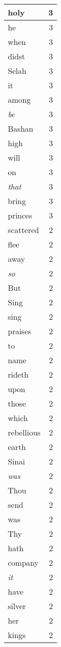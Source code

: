 \begin{center}
\begin{longtable}{l|r}
holy & 3 \\ \hline
he & 3 \\ \hline
when & 3 \\ \hline
didst & 3 \\ \hline
Selah & 3 \\ \hline
it & 3 \\ \hline
among & 3 \\ \hline
\emph{be} & 3 \\ \hline
Bashan & 3 \\ \hline
high & 3 \\ \hline
will & 3 \\ \hline
on & 3 \\ \hline
\emph{that} & 3 \\ \hline
bring & 3 \\ \hline
princes & 3 \\ \hline
scattered & 2 \\ \hline
flee & 2 \\ \hline
away & 2 \\ \hline
\emph{so} & 2 \\ \hline
But & 2 \\ \hline
Sing & 2 \\ \hline
sing & 2 \\ \hline
praises & 2 \\ \hline
to & 2 \\ \hline
name & 2 \\ \hline
rideth & 2 \\ \hline
upon & 2 \\ \hline
those & 2 \\ \hline
which & 2 \\ \hline
rebellious & 2 \\ \hline
earth & 2 \\ \hline
Sinai & 2 \\ \hline
\emph{was} & 2 \\ \hline
Thou & 2 \\ \hline
send & 2 \\ \hline
was & 2 \\ \hline
Thy & 2 \\ \hline
hath & 2 \\ \hline
company & 2 \\ \hline
\emph{it} & 2 \\ \hline
have & 2 \\ \hline
silver & 2 \\ \hline
her & 2 \\ \hline
kings & 2 \\ \hline

\end{longtable}
\end{center}
